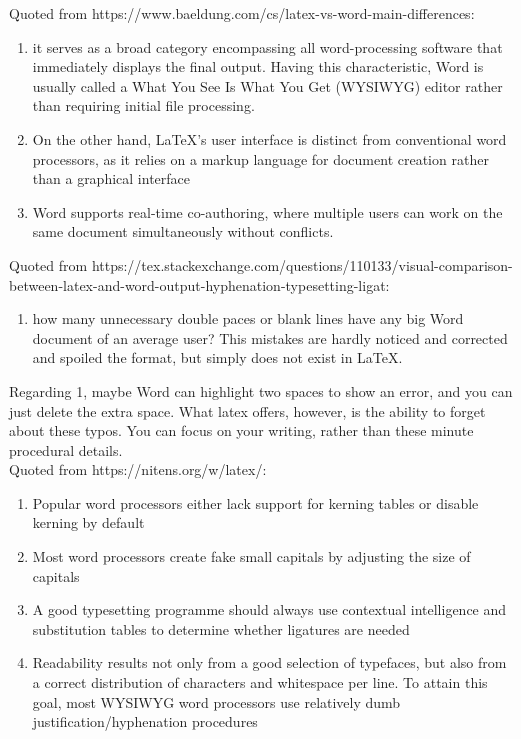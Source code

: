 \documentclass[12pt]{article}
\begin{document}
Quoted from https://www.baeldung.com/cs/latex-vs-word-main-differences:
\begin{enumerate}
  \item it serves as a broad category encompassing all word-processing software that immediately displays the final output. Having this characteristic, Word is usually called a What You See Is What You Get (WYSIWYG) editor rather than requiring initial file processing.
  \item On the other hand, LaTeX’s user interface is distinct from conventional word processors, as it relies on a markup language for document creation rather than a graphical interface
  \item Word supports real-time co-authoring, where multiple users can work on the same document simultaneously without conflicts.\\
\end{enumerate}

Quoted from https://tex.stackexchange.com/questions/110133/visual-comparison-between-latex-and-word-output-hyphenation-typesetting-ligat:
\begin{enumerate}
  \item how many unnecessary double paces or blank lines have any big Word document of an average user? This mistakes are hardly noticed and corrected and spoiled the format, but simply does not exist in LaTeX.
\end{enumerate}

Regarding 1, maybe Word can highlight two spaces to show an error, and you can just delete the extra space. What latex offers, however, is the ability to forget about these typos. You can focus on your writing, rather than these minute procedural details.\\

Quoted from https://nitens.org/w/latex/:
\begin{enumerate}
  \item Popular word processors either lack support for kerning tables or disable kerning by default
  \item Most word processors create fake small capitals by adjusting the size of capitals
  \item A good typesetting programme should always use contextual intelligence and substitution tables to determine whether ligatures are needed
        \item Readability results not only from a good selection of typefaces, but also from a correct distribution of characters and whitespace per line. To attain this goal, most WYSIWYG word processors use relatively dumb justification/hyphenation procedures
\end{enumerate}
\end{document}
